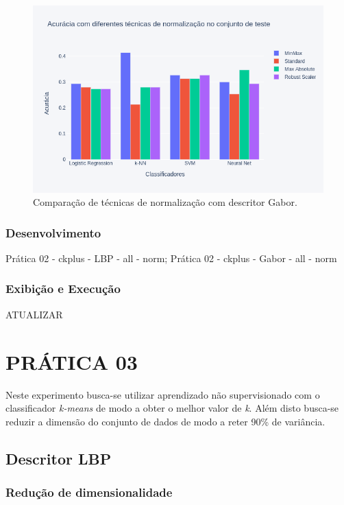 \documentclass[a4paper, 12 pt, conference]{ieeeconf}  %
\begin{document}
\begin{figure}[!htbp]
	\centering
	\includegraphics[width=1.0\linewidth,clip=true,trim=0cm 0cm 0cm 0cm, keepaspectratio=true]{bar_norm_all_gabor.png}
	\caption{Comparação de técnicas de normalização com descritor Gabor.}
	\label{fig:bar_norm_all_gabor}
\end{figure}

\subsubsection{Desenvolvimento} Prática 02 - ckplus  - LBP - all - norm; Prática 02 - ckplus  - Gabor - all - norm
\subsubsection{Exibição e Execução} ATUALIZAR

\section{PRÁTICA 03}
\label{pratica03}

Neste experimento busca-se utilizar aprendizado não supervisionado com o classificador \textit{k-means} de modo a obter o melhor valor de \textit{k}. Além disto busca-se reduzir a dimensão do conjunto de dados de modo a reter 90\% de variância.

\subsection{Descritor LBP}
\subsubsection{Redução de dimensionalidade}
\end{document}
